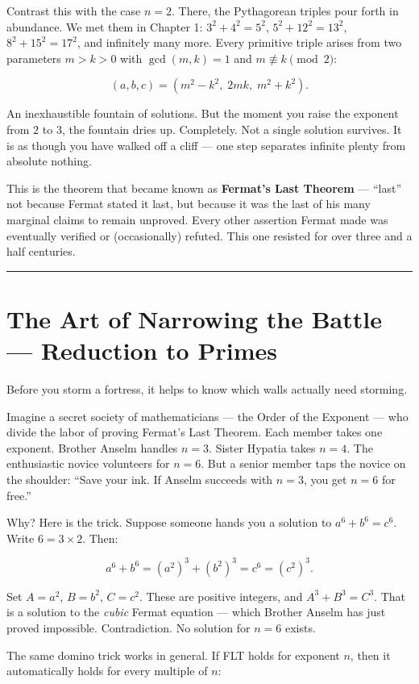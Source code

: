 Contrast this with the case \(n = 2\). There, the Pythagorean triples pour forth in abundance. We met them in Chapter 1: \(3^2 + 4^2 = 5^2\), \(5^2 + 12^2 = 13^2\), \(8^2 + 15^2 = 17^2\), and infinitely many more. Every primitive triple arises from two parameters \(m > k > 0\) with \(\gcd(m, k) = 1\) and \(m \not\equiv k \pmod{2}\):

\[(a, b, c) = (m^2 - k^2,\; 2mk,\; m^2 + k^2).\]

An inexhaustible fountain of solutions. But the moment you raise the exponent from \(2\) to \(3\), the fountain dries up. Completely. Not a single solution survives. It is as though you have walked off a cliff --- one step separates infinite plenty from absolute nothing.

This is the theorem that became known as \textbf{Fermat's Last Theorem} --- ``last'' not because Fermat stated it last, but because it was the last of his many marginal claims to remain unproved. Every other assertion Fermat made was eventually verified or (occasionally) refuted. This one resisted for over three and a half centuries.

\bigskip\noindent\rule{\linewidth}{0.4pt}\bigskip

\section{The Art of Narrowing the Battle --- Reduction to Primes}
Before you storm a fortress, it helps to know which walls actually need storming.

Imagine a secret society of mathematicians --- the Order of the Exponent --- who divide the labor of proving Fermat's Last Theorem. Each member takes one exponent. Brother Anselm handles \(n = 3\). Sister Hypatia takes \(n = 4\). The enthusiastic novice volunteers for \(n = 6\). But a senior member taps the novice on the shoulder: ``Save your ink. If Anselm succeeds with \(n = 3\), you get \(n = 6\) for free.''

Why? Here is the trick. Suppose someone hands you a solution to \(a^6 + b^6 = c^6\). Write \(6 = 3 \times 2\). Then:

\[a^6 + b^6 = (a^2)^3 + (b^2)^3 = c^6 = (c^2)^3.\]

Set \(A = a^2\), \(B = b^2\), \(C = c^2\). These are positive integers, and \(A^3 + B^3 = C^3\). That is a solution to the \emph{cubic} Fermat equation --- which Brother Anselm has just proved impossible. Contradiction. No solution for \(n = 6\) exists.

The same domino trick works in general. If FLT holds for exponent \(n\), then it automatically holds for every multiple of \(n\):

